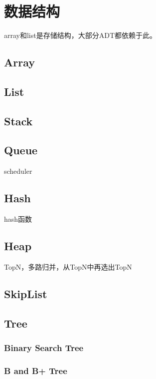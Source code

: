 \chapter{数据结构}

array和list是存储结构，大部分ADT都依赖于此。

\section{Array}

\section{List}

\section{Stack}

\section{Queue}

scheduler

\section{Hash}

hash函数

\section{Heap}

TopN，多路归并，从TopN中再选出TopN

\section{SkipList}

\section{Tree}

\subsection{Binary Search Tree}

\subsection{B and B+ Tree}

